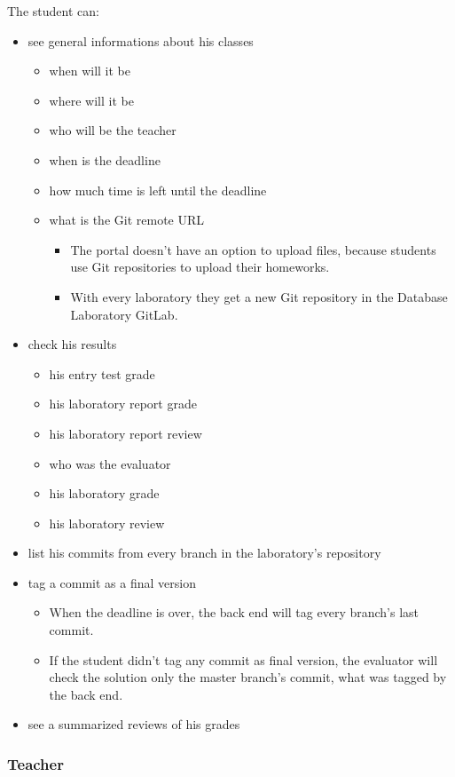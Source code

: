 The student can:

\begin{itemize}
	\item see general informations about his classes
	\begin{itemize}
		\item when will it be
		\item where will it be
		\item who will be the teacher
		\item when is the deadline
		\item how much time is left until the deadline
		\item what is the Git remote URL
		\begin{itemize}
			\item The portal doesn't have an option to upload files, because students use Git repositories to upload their homeworks.
			\item With every laboratory they get a new Git repository in the Database Laboratory GitLab.
		\end{itemize}
	\end{itemize}
	\item check his results
	\begin{itemize}
		\item his entry test grade
		\item his laboratory report grade
		\item his laboratory report review
		\item who was the evaluator
		\item his laboratory grade
		\item his laboratory review
	\end{itemize}
	\item list his commits from every branch in the laboratory's repository
	\item tag a commit as a final version
	\begin{itemize}
		\item When the deadline is over, the back end will tag every branch's last commit.
		\item If the student didn't tag any commit as final version, the evaluator will check the solution only the master branch's commit, what was tagged by the back end.
	\end{itemize}
	\item see a summarized reviews of his grades
\end{itemize}

\subsubsection{Teacher}

